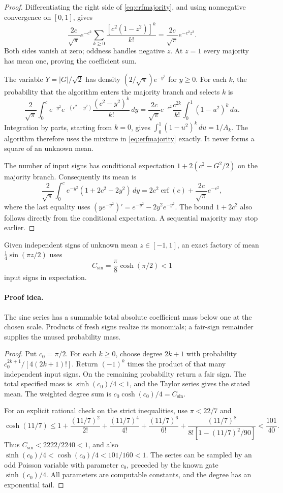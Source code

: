 \begin{proof}
Differentiating the right side of \eqref{eq:erfmajority}, and using
nonnegative convergence on $[0,1]$, gives
\[
 \frac{2c}{\sqrt\pi}e^{-c^2}
 \sum_{k\ge0}\frac{[c^2(1-z^2)]^k}{k!}
 =\frac{2c}{\sqrt\pi}e^{-c^2z^2}.
\]
Both sides vanish at zero; oddness handles negative $z$. At $z=1$
every majority has mean one, proving the coefficient sum.

The variable $Y=|G|/\sqrt2$ has density
$(2/\sqrt\pi)e^{-y^2}$ for $y\ge0$. For each $k$, the probability
that the algorithm enters the majority branch and selects $k$ is
\[
 \frac2{\sqrt\pi}\int_0^c e^{-y^2}
       e^{-(c^2-y^2)}\frac{(c^2-y^2)^k}{k!}\,dy
 =\frac{2c}{\sqrt\pi}e^{-c^2}\frac{c^{2k}}{k!}
       \int_0^1(1-u^2)^k\,du.
\]
Integration by parts, starting from $k=0$, gives
$\int_0^1(1-u^2)^k\,du=1/A_k$. The algorithm therefore uses the
mixture in \eqref{eq:erfmajority} exactly. It never forms a square
of an unknown mean.

The number of input signs has conditional expectation
$1+2(c^2-G^2/2)$ on the majority branch. Consequently its mean is
\[
 \frac2{\sqrt\pi}\int_0^c
   e^{-y^2}(1+2c^2-2y^2)\,dy
 =2c^2\operatorname{erf}(c)+\frac{2c}{\sqrt\pi}e^{-c^2},
\]
where the last equality uses
$(y e^{-y^2})'=e^{-y^2}-2y^2e^{-y^2}$.
The bound $1+2c^2$ also follows directly from the conditional
expectation. A sequential majority may stop earlier.
\end{proof}

\begin{lemma}
\label{lem:sinequarter}
Given independent signs of unknown mean $z\in[-1,1]$, an exact
factory of mean $\frac14\sin(\pi z/2)$ uses
\[
 C_{\sin}=\frac\pi8\cosh(\pi/2)<1
\]
input signs in expectation.
\end{lemma}
\paragraph{Proof idea.}
The sine series has a summable total absolute coefficient mass
below one at the chosen scale. Products of fresh signs realize its monomials;
a fair-sign remainder supplies the unused probability mass.

\begin{proof}
Put $c_0=\pi/2$. For each $k\ge0$, choose degree $2k+1$ with
probability $c_0^{2k+1}/[4(2k+1)!]$. Return $(-1)^k$ times the
product of that many independent input signs. On the remaining
probability return a fair sign. The total specified mass is
$\sinh(c_0)/4<1$, and the Taylor series gives the stated mean.
The weighted degree sum is $c_0\cosh(c_0)/4=C_{\sin}$.

For an explicit rational check on the strict inequalities, use
$\pi<22/7$ and
\[
 \cosh(11/7)\le
 1+\frac{(11/7)^2}{2!}+\frac{(11/7)^4}{4!}
 +\frac{(11/7)^6}{6!}
 +\frac{(11/7)^8}{8![1-(11/7)^2/90]}<\frac{101}{40}.
\]
Thus $C_{\sin}<2222/2240<1$, and also
$\sinh(c_0)/4<\cosh(c_0)/4<101/160<1$.
The series can be sampled by an odd Poisson variable with parameter
$c_0$, preceded by the known gate $\sinh(c_0)/4$. All parameters
are computable constants, and the degree has an exponential tail.
\end{proof}

